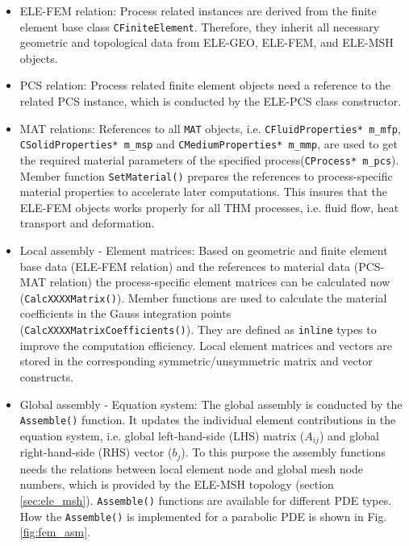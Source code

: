 \begin{itemize}
 \item ELE-FEM relation:
Process related instances are derived from the finite element base
class \texttt{CFiniteElement}. Therefore, they inherit all
necessary geometric and topological data from ELE-GEO, ELE-FEM,
and ELE-MSH objects.
 \item PCS relation:
Process related finite element objects need a reference to the
related PCS instance, which is conducted by the ELE-PCS class
constructor.
 \item MAT relations:
References to all \texttt{MAT} objects, i.e.
\texttt{CFluidProperties* m\_mfp}, \texttt{CSolidProper\-ties*
m\_msp} and \texttt{CMediumProperties* m\_mmp}, are used to get
the required material parameters of the specified
process(\texttt{CProcess* m\_pcs}). Member function
\texttt{SetMaterial()} prepares the references to process-specific
material properties to accelerate later computations. This insures
that the ELE-FEM objects works properly for all THM processes,
i.e. fluid flow, heat transport and deformation.
 \item Local assembly - Element matrices:
Based on geometric and finite element base data (ELE-FEM relation)
and the references to material data (PCS-MAT relation) the
process-specific element matrices can be calculated now
(\texttt{CalcXXXXMatrix()}). Member functions are used to
calculate the material coefficients in the Gauss integration
points (\texttt{CalcXXXXMatrixCoefficients()}). They are defined
as \texttt{inline} types to improve the computation efficiency.
Local element matrices and vectors are stored in the corresponding
symmetric/unsymmetric matrix and vector constructs.
 \item Global assembly - Equation system:
The global assembly is conducted by the \texttt{Assemble()}
function. It updates the individual element contributions in the
equation system, i.e. global left-hand-side (LHS) matrix
($A_{ij}$) and global right-hand-side (RHS) vector ($b_j$). To
this purpose the assembly functions needs the relations between
local element node and global mesh node numbers, which is provided
by the ELE-MSH topology (section \ref{sec:ele_msh}).
\texttt{Assemble()} functions are available for different PDE
types. How the \texttt{Assemble()} is implemented for a parabolic
PDE is shown in Fig. \ref{fig:fem_asm}.
\end{itemize}

